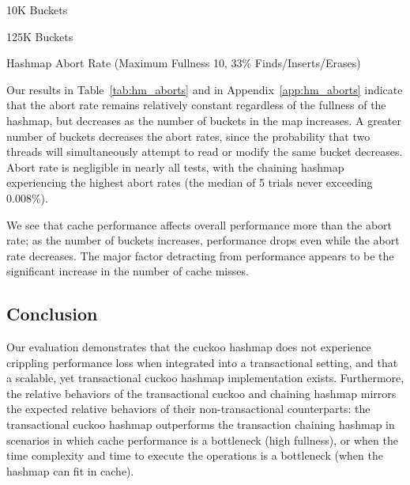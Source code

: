     \begin{table}[t]
    \centering
	\singlespace
        \begin{minipage}{\textwidth}
            \centering
        
        \caption*{10K Buckets}
            \vspace{12pt}
        \end{minipage}
        \begin{minipage}{\textwidth}
            \centering
        
        \caption*{125K Buckets}
        \end{minipage}
        \caption{Hashmap Abort Rate (Maximum Fullness 10, 33\% Finds/Inserts/Erases)}
		\label{tab:hm_aborts}
    \end{table}

    Our results in Table~\ref{tab:hm_aborts} and in Appendix~\ref{app:hm_aborts} indicate that the abort rate remains relatively constant regardless of the fullness of the hashmap, but decreases as the number of buckets in the map increases. A greater number of buckets decreases the abort rates, since the probability that two threads will simultaneously attempt to read or modify the same bucket decreases. Abort rate is negligible in nearly all tests, with the chaining hashmap experiencing the highest abort rates (the median of 5 trials never exceeding 0.008\%).

We see that cache performance affects overall performance more than the abort rate; as the number of buckets increases, performance drops even while the abort rate decreases. The major factor detracting from performance appears to be the significant increase in the number of cache misses.

\vspace{12pt}
\noindent{}

\subsection{Conclusion}

Our evaluation demonstrates that the cuckoo hashmap does not experience crippling performance loss when integrated into a transactional setting, and that a scalable, yet transactional cuckoo hashmap implementation exists. Furthermore, the relative behaviors of the transactional cuckoo and chaining hashmap mirrors the expected relative behaviors of their non-transactional counterparts: the transactional cuckoo hashmap outperforms the transaction chaining hashmap in scenarios in which cache performance is a bottleneck (high fullness), or when the time complexity and time to execute the operations is a bottleneck (when the hashmap can fit in cache). 

